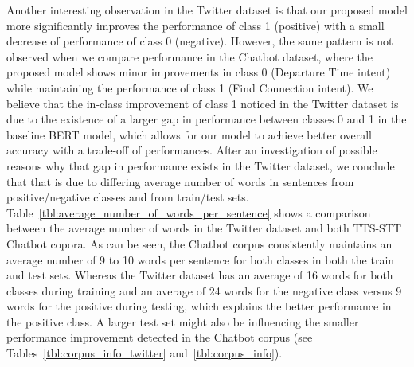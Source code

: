 \documentclass[review]{elsarticle}
\begin{document}
\begin{table}[ht!]
   \centering
   \caption{Comparison of performance improvement in relation to varying levels of noise between the TTS-STT Chatbot datasets, namely \textit{gtts-witai} and \textit{macsay-witai}, and the Twitter Sentiment Dataset with incorrect text (\textit{Inc}). Note that, for fair comparison, the WER score for the Twitter dataset has also been included here, even though that score is usually only used to measure levels of noise in text with STT error, which is only present in the Chatbot corpus.} \label{tbl:noise_level_comparison_performance}
\end{table}

Another interesting observation in the Twitter dataset is that our proposed model more significantly improves the performance of class 1 (positive) with a small decrease of performance of class 0 (negative). However, the same pattern is not observed when we compare performance in the Chatbot dataset, where the proposed model shows minor improvements in class 0 (Departure Time intent) while maintaining the performance of class 1 (Find Connection intent). We believe that the in-class improvement of class 1 noticed in the Twitter dataset is due to the existence of a larger gap in performance between classes 0 and 1 in the baseline BERT model, which allows for our model to achieve better overall accuracy with a trade-off of performances. After an investigation of possible reasons why that gap in performance exists in the Twitter dataset, we conclude that that is due to differing average number of words in sentences from positive/negative classes and from train/test sets. Table~\ref{tbl:average_number_of_words_per_sentence} shows a comparison between the average number of words in the Twitter dataset and both TTS-STT Chatbot copora. As can be seen, the Chatbot corpus consistently maintains an average number of 9 to 10 words per sentence for both classes in both the train and test sets. Whereas the Twitter dataset has an average of 16 words for both classes during training and an average of 24 words for the negative class versus 9 words for the positive during testing, which explains the better performance in the positive class. A larger test set might also be influencing the smaller performance improvement detected in the Chatbot corpus (see Tables~\ref{tbl:corpus_info_twitter} and~\ref{tbl:corpus_info}).
\end{document}
